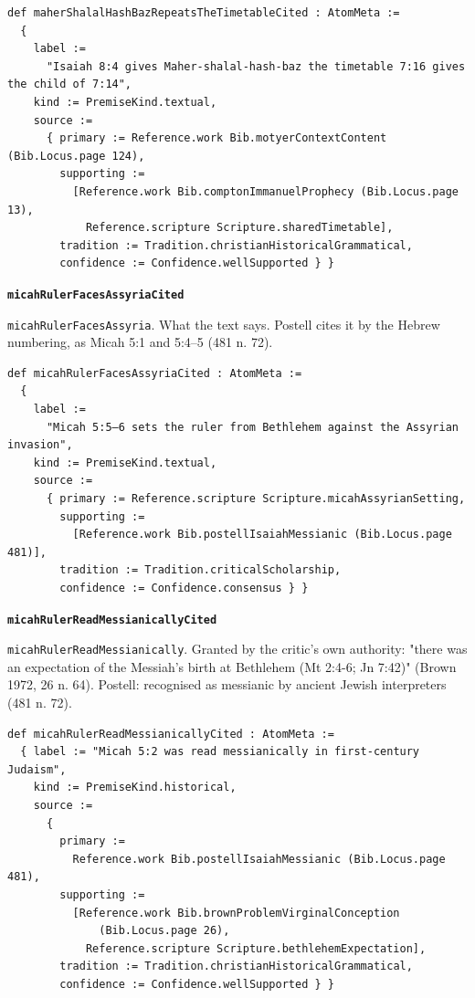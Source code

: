 \documentclass[11pt]{article}
\begin{document}
{\small\begin{verbatim}
def maherShalalHashBazRepeatsTheTimetableCited : AtomMeta :=
  {
    label :=
      "Isaiah 8:4 gives Maher-shalal-hash-baz the timetable 7:16 gives the child of 7:14",
    kind := PremiseKind.textual,
    source :=
      { primary := Reference.work Bib.motyerContextContent (Bib.Locus.page 124),
        supporting :=
          [Reference.work Bib.comptonImmanuelProphecy (Bib.Locus.page 13),
            Reference.scripture Scripture.sharedTimetable],
        tradition := Tradition.christianHistoricalGrammatical,
        confidence := Confidence.wellSupported } }
\end{verbatim}}
\par\medskip\noindent\textbf{\texttt{micah\allowbreak{}Ruler\allowbreak{}Faces\allowbreak{}Assyria\allowbreak{}Cited}}\par\nobreak\noindent
\texttt{micah\allowbreak{}Ruler\allowbreak{}Faces\allowbreak{}Assyria}. What the text says. Postell cites it by the Hebrew numbering, as Micah 5:1 and 5:4–5 (481 n. 72).

{\small\begin{verbatim}
def micahRulerFacesAssyriaCited : AtomMeta :=
  {
    label :=
      "Micah 5:5–6 sets the ruler from Bethlehem against the Assyrian invasion",
    kind := PremiseKind.textual,
    source :=
      { primary := Reference.scripture Scripture.micahAssyrianSetting,
        supporting :=
          [Reference.work Bib.postellIsaiahMessianic (Bib.Locus.page 481)],
        tradition := Tradition.criticalScholarship,
        confidence := Confidence.consensus } }
\end{verbatim}}
\par\medskip\noindent\textbf{\texttt{micah\allowbreak{}Ruler\allowbreak{}Read\allowbreak{}Messianically\allowbreak{}Cited}}\par\nobreak\noindent
\texttt{micah\allowbreak{}Ruler\allowbreak{}Read\allowbreak{}Messianically}. Granted by the critic's own authority: "there was an expectation of the Messiah's birth at Bethlehem (Mt 2:4-6; Jn 7:42)" (Brown 1972, 26 n. 64). Postell: recognised as messianic by ancient Jewish interpreters (481 n. 72).

{\small\begin{verbatim}
def micahRulerReadMessianicallyCited : AtomMeta :=
  { label := "Micah 5:2 was read messianically in first-century Judaism",
    kind := PremiseKind.historical,
    source :=
      {
        primary :=
          Reference.work Bib.postellIsaiahMessianic (Bib.Locus.page 481),
        supporting :=
          [Reference.work Bib.brownProblemVirginalConception
              (Bib.Locus.page 26),
            Reference.scripture Scripture.bethlehemExpectation],
        tradition := Tradition.christianHistoricalGrammatical,
        confidence := Confidence.wellSupported } }
\end{verbatim}}
\end{document}
